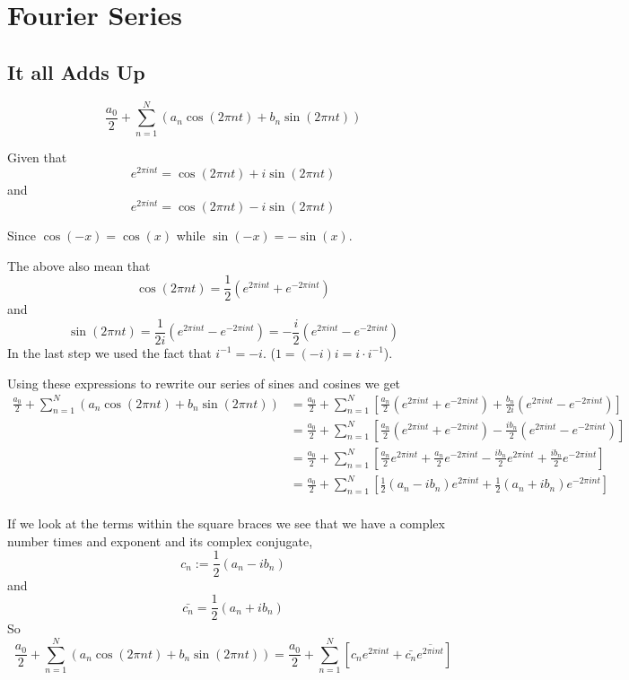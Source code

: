 \section{Fourier Series}

\subsection{It all Adds Up}

$$
\frac{a_0}{2} + \sum^{N}_{n=1} \left(a_n \cos(2\pi nt) + b_n \sin(2\pi nt)\right)
$$

Given that
$$
e^{2\pi int} = \cos(2\pi nt) + i\sin(2\pi nt)
$$
and
$$
e^{2\pi int} = \cos(2\pi nt) - i\sin(2\pi nt)
$$

Since $\cos(-x) = \cos(x)$ while $\sin(-x) = -\sin(x)$.

The above also mean that
$$
\cos(2\pi nt) = \frac{1}{2}\left( e^{2\pi int} + e^{-2\pi int} \right)
$$
and
$$
\sin(2\pi nt) = \frac{1}{2i}\left( e^{2\pi int} - e^{-2\pi int} \right)
= -\frac{i}{2} \left( e^{2\pi int} - e^{-2\pi int} \right)
$$
In the last step we used the fact that $i^{-1} = -i$. ($1 = (-i)i = i\cdot i^{-1}$).

Using these expressions to rewrite our series of sines and cosines we get
\begin{align*}
\frac{a_0}{2} + \sum^{N}_{n=1} \left(a_n \cos(2\pi nt) + b_n \sin(2\pi nt)\right)
&= \frac{a_0}{2} + \sum^{N}_{n=1} \left[ \frac{a_n}{2}\left(e^{2\pi int} + e^{-2\pi int}\right) + \frac{b_n}{2i} \left( e^{2\pi int} - e^{-2\pi int} \right) \right] \\
&= \frac{a_0}{2} + \sum^{N}_{n=1} \left[ \frac{a_n}{2}\left(e^{2\pi int} + e^{-2\pi int}\right) - \frac{i b_n}{2} \left( e^{2\pi int} - e^{-2\pi int} \right) \right] \\
&= \frac{a_0}{2} + \sum^{N}_{n=1} \left[ \frac{a_n}{2} e^{2\pi int} + \frac{a_n}{2} e^{-2\pi int} - \frac{i b_n}{2} e^{2\pi int} + \frac{i b_n}{2} e^{-2\pi int}  \right] \\
&= \frac{a_0}{2} + \sum^{N}_{n=1} \left[ \frac{1}{2}\left(a_n - ib_n\right) e^{2\pi int} + \frac{1}{2}\left(a_n + ib_n\right) e^{-2\pi int} \right] \\
\end{align*}

If we look at the terms within the square braces we see that we have a complex number times and exponent
and its complex conjugate,
$$
c_n := \frac{1}{2}\left(a_n - ib_n\right)
$$
and
$$
\bar{c_n} = \frac{1}{2}\left(a_n + ib_n\right)
$$
So
$$
\frac{a_0}{2} + \sum^{N}_{n=1} \left(a_n \cos(2\pi nt) + b_n \sin(2\pi nt)\right)
= \frac{a_0}{2} + \sum^{N}_{n=1} \left[ c_n e^{2\pi int} + \bar{c_n} \overline{e^{2\pi int}} \right]
$$

